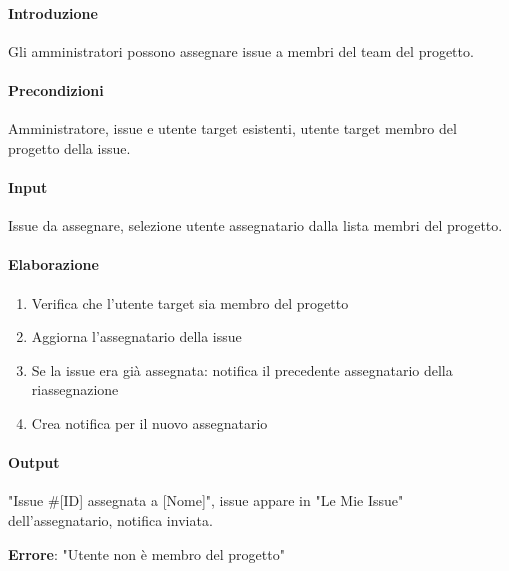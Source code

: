 \begin{reqbox}[title=REQ-FUN-24: Assegna Issue (solo Admin)]
\label{subsubsec:req-assegna-issue}

\paragraph{Introduzione}
Gli amministratori possono assegnare issue a membri del team del progetto.

\paragraph{Precondizioni}
Amministratore, issue e utente target esistenti, utente target membro del progetto della issue.

\paragraph{Input}
Issue da assegnare, selezione utente assegnatario dalla lista membri del progetto.

\paragraph{Elaborazione}
\begin{enumerate}[leftmargin=1.1em]
\item Verifica che l'utente target sia membro del progetto
\item Aggiorna l'assegnatario della issue
\item Se la issue era già assegnata: notifica il precedente assegnatario della riassegnazione
\item Crea notifica per il nuovo assegnatario
\end{enumerate}

\paragraph{Output}
"Issue \#[ID] assegnata a [Nome]", issue appare in "Le Mie Issue" dell'assegnatario, notifica inviata.

\textbf{Errore}: "Utente non è membro del progetto"

\end{reqbox}

\vspace{0.5cm}

\newpage


